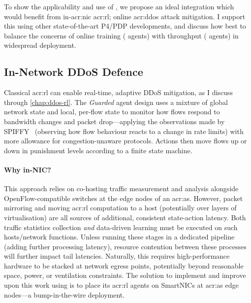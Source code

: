 To show the applicability and use of \approachshort{}, we propose an ideal integration which would benefit from in-\gls{acr:nic} \gls{acr:rl}; online \gls{acr:ddos} attack mitigation.
I support this using other state-of-the-art P4/PDP developments, and discuss how best to balance the concerns of online training (\Coopfw{} agents) with throughput (\Indfw{} agents) in widespread deployment.


\subsection{In-Network DDoS Defence}\label{sec:integ-1}
Classical \gls{acr:rl} can enable real-time, adaptive DDoS mitigation, as I discuss through \cref{chap:ddos-rl}.
The \emph{Guarded} agent design uses a mixture of global network state and local, per-flow state to monitor how flows respond to bandwidth changes and packet drop---applying the observations made by SPIFFY~\parencite{DBLP:conf/ndss/KangGS16} (observing how flow behaviour reacts to a change in rate limits) with more allowance for congestion-unaware protocols.
Actions then move flows up or down in punishment levels according to a finite state machine.

\paragraph{Why in-NIC?}
This approach relies on co-hosting traffic measurement and analysis alongside OpenFlow-compatible switches at the edge nodes of an \gls{acr:as}.
However, packet mirroring and moving \gls{acr:rl} computation to a host (potentially over layers of virtualisation) are all sources of additional, consistent state-action latency.
Both traffic statistics collection \emph{and} data-driven learning must be executed on such hosts/network functions.
Unless running these stages in a dedicated pipeline (adding further processing latency), resource contention between these processes will further impact tail latencies.
Naturally, this requires high-performance hardware to be stacked at network egress points, potentially beyond reasonable space, power, or ventilation constraints.
The solution to implement and improve upon this work using \approachshort{} is to place its \gls{acr:rl} agents on SmartNICs at \gls{acr:as} edge nodes---a bump-in-the-wire deployment.

